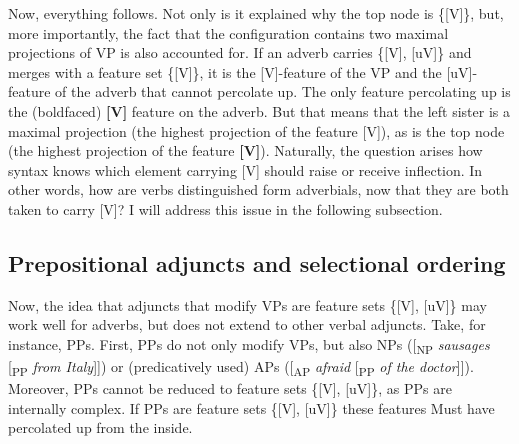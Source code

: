 \documentclass[output=paper
,modfonts
,nonflat]{langsci/langscibook}
\begin{document}
\begin{figure}[!h]
	\begin{exe}
	\end{exe}
\end{figure} 
\noindent Now, everything follows. Not only is it explained why the top node is \{[V]\}, but, more importantly, the fact that the configuration contains two maximal projections of VP is also accounted for. If an adverb carries \{[V], [uV]\} and merges with a feature set \{[V]\}, it is the [V]-feature of the VP and the [uV]-feature of the adverb that cannot percolate up. The only feature percolating up is the (boldfaced) \textbf{[V]} feature on the adverb. But that means that the left sister is a maximal projection (the highest projection of the feature [V]), as is the top node (the highest projection of the feature \textbf{[V]}). Naturally, the question arises how syntax knows which element carrying [V] should raise or receive inflection. In other words, how are verbs distinguished form adverbials, now that they are both taken to carry [V]? I will address this issue in the following subsection.

\subsection{Prepositional adjuncts and selectional ordering}
Now, the idea that adjuncts that modify VPs are feature sets \{[V], [uV]\} may work well for adverbs, but does not extend to other verbal adjuncts. Take, for instance, PPs. First, PPs do not only modify VPs, but also NPs ([\textsubscript{NP} \textit{sausages} [\textsubscript{PP} \textit{from Italy}]]) or (predicatively used) APs ([\textsubscript{AP} \textit{afraid} [\textsubscript{PP} \textit{of the doctor}]]). Moreover, PPs cannot be reduced to feature sets \{[V], [uV]\}, as PPs are internally complex. If PPs are feature sets \{[V], [uV]\} these features Must have percolated up from the inside.
\end{document}
